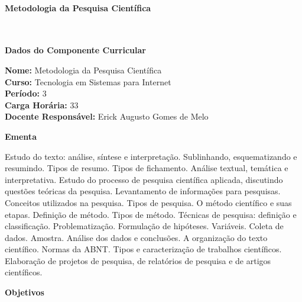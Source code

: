 \paragraph{Metodologia da Pesquisa Cient\'ifica} \


\begin{snugshade}\begin{center}\textbf{
    Dados do Componente Curricular
}\end{center}\end{snugshade}

\noindent \textbf{Nome:}                Metodologia da Pesquisa Cient\'ifica
\\        \textbf{Curso:}               Tecnologia em Sistemas para Internet
\\        \textbf{Período:}             \unit{3}{\degree}
\\        \textbf{Carga Horária:}       \unit{33}{\hour}
\\        \textbf{Docente Responsável:} Erick Augusto Gomes de Melo 


\begin{snugshade}\begin{center}\textbf{
    Ementa
\vphantom{q}}\end{center}\end{snugshade}

\noindent
Estudo do texto: análise, síntese e interpretação. Sublinhando, esquematizando e resumindo. Tipos de resumo. Tipos de fichamento. Análise textual, temática e interpretativa. Estudo do processo de pesquisa científica aplicada, discutindo questões teóricas da pesquisa. Levantamento de informações para pesquisas. Conceitos utilizados na pesquisa. Tipos de pesquisa. O método científico e suas etapas. Definição de método. Tipos de método. Técnicas de pesquisa: definição e classificação. Problematização. Formulação de hipóteses. Variáveis. Coleta de dados. Amostra. Análise dos dados e conclusões. A organização do texto científico. Normas da ABNT. Tipos e caracterização de trabalhos científicos. Elaboração de projetos de pesquisa, de relatórios de pesquisa e de artigos científicos.


\begin{snugshade}\begin{center}\textbf{
    Objetivos
}\end{center}\end{snugshade}

